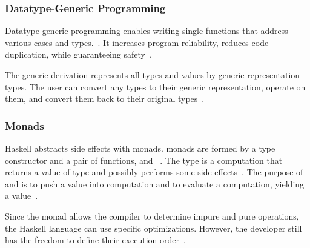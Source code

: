 \begin{frame}\frametitle{Datatype-Generic Programming}
    
  Datatype-generic programming enables writing single functions that address various cases and types.~\cite{derivable-type-classes}. 
  It increases program reliability, reduces code duplication, while guaranteeing safety~\cite{datatype-generic-programming,optimizing-generics}.
  
      
  The generic derivation represents all types and values by generic representation types. The user can convert any types to their generic representation, operate on them, and convert them back to their original types~\cite{optimizing-generics, ghc-generics}.
  
  \end{frame}

\begin{frame}\frametitle{Monads}

Haskell abstracts side effects with monads. monads are formed by a type constructor  and a pair of functions,  and \expr{>>=}~\cite{history-of-haskell,essence-of-fp}. The type  is a computation that returns a value of type  and possibly performs some side effects~\cite{history-of-haskell}. The purpose of  and \expr{>>=} is to push a value into computation and to evaluate a computation, yielding a value~\cite{essence-of-fp}.

Since the monad allows the compiler to determine impure and pure operations, the Haskell language can use specific optimizations. However, the developer still has the freedom to define their execution order~\cite{history-of-haskell}.

\end{frame}

